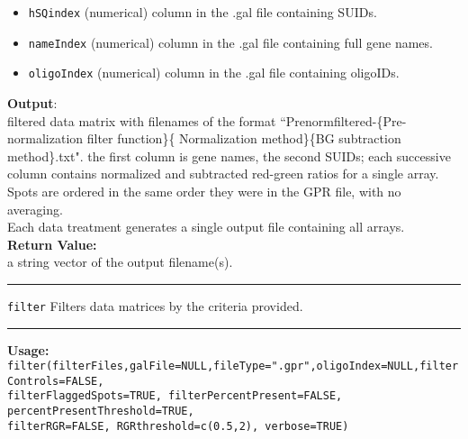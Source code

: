 \documentclass[10pt]{article}
\newcommand{\fquote}{``}
\begin{document}
\begin{itemize}
     	\item \texttt{hSQindex} (numerical) column in the .gal file containing SUIDs. 
     	\item \texttt{nameIndex} (numerical) column in the .gal file containing full gene names.
      	\item \texttt{oligoIndex} (numerical) column in the .gal file containing oligoIDs.
\end{itemize}
\textbf{Output}:\\
filtered data matrix with filenames of the format \fquote Prenormfiltered-\{Pre-normalization filter function\}\textunderscore\{ Normalization method\}\textunderscore\{BG subtraction method\}.txt". the first column is gene names, the second SUIDs; each successive column contains normalized and subtracted red-green ratios for a single array. Spots are ordered in the same order they were in the GPR file, with no averaging.\\
Each data treatment generates a single output file containing all arrays.\\
  \textbf{Return Value:}\\ 
  a string vector of the output filename(s).\\
  \rule{\linewidth}{0.4pt}
  \texttt{filter} \hspace{1in} Filters data matrices by the criteria provided.\\
    \rule{\linewidth}{0.4pt}
\textbf{Usage:}\\
  \texttt{filter(filterFiles,galFile=NULL,fileType=".gpr",oligoIndex=NULL,filterControls=FALSE,\\ 
\indent filterFlaggedSpots=TRUE, filterPercentPresent=FALSE,
                 percentPresentThreshold=TRUE,\\ \indent filterRGR=FALSE, RGRthreshold=c(0.5,2), verbose=TRUE)}
\end{document}
